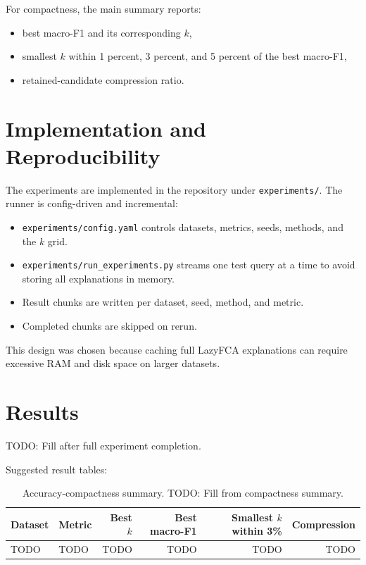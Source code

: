 \documentclass[11pt]{article}
\begin{document}
For compactness, the main summary reports:

\begin{itemize}[leftmargin=*]
    \item best macro-F1 and its corresponding $k$,
    \item smallest $k$ within 1 percent, 3 percent, and 5 percent of the best
    macro-F1,
    \item retained-candidate compression ratio.
\end{itemize}

\section{Implementation and Reproducibility}

The experiments are implemented in the repository under
\texttt{experiments/}. The runner is config-driven and incremental:

\begin{itemize}[leftmargin=*]
    \item \texttt{experiments/config.yaml} controls datasets, metrics,
    seeds, methods, and the $k$ grid.
    \item \texttt{experiments/run\_experiments.py} streams one
    test query at a time to avoid storing all explanations in memory.
    \item Result chunks are written per dataset, seed, method, and metric.
    \item Completed chunks are skipped on rerun.
\end{itemize}

This design was chosen because caching full LazyFCA explanations can require
excessive RAM and disk space on larger datasets.

\section{Results}

TODO: Fill after full experiment completion.

Suggested result tables:

\begin{table}[h]
\centering
\caption{Accuracy-compactness summary. TODO: Fill from compactness summary.}
\begin{tabular}{llrrrr}
\toprule
Dataset & Metric & Best $k$ & Best macro-F1 & Smallest $k$ within 3\% & Compression \\
\midrule
TODO & TODO & TODO & TODO & TODO & TODO \\
\bottomrule
\end{tabular}
\end{table}
\end{document}
